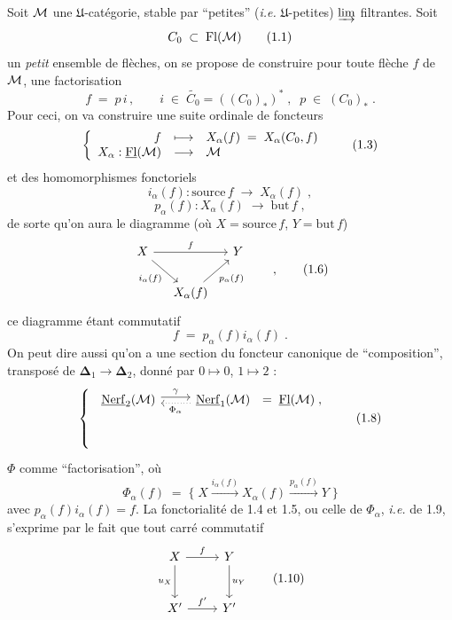 Soit $\mathcal{M}$ une $\mathfrak{U}$-catégorie, stable par “petites” (\textit{i.e.} $\mathfrak{U}$-petites) $\varinjlim$ filtrantes. Soit
\[
C_0 \;\subset\; \mathrm{Fl}(\mathcal{M})
\tag*{(1.1)}
\]
un \textit{petit} ensemble de flèches, on se propose de construire pour toute flèche $f$ de $\mathcal{M}$, une factorisation
\[
f \;=\; p\,i \,, \qquad i \;\in\; \widetilde{C_0} = ((C_0)_*)^* \;, \;\; p \;\in\; (C_0)_* \;.
\tag*{(1.2)}
\]
Pour ceci, on va construire une suite ordinale de foncteurs
\[
\left\{
\begin{array}{rcl}
f & \longmapsto & X_\alpha(f) \;=\; X_\alpha(C_0,f) \\
X_\alpha : \underline{\mathrm{Fl}}(\mathcal{M}) & \longrightarrow & \mathcal{M}
\end{array}
\right.
\tag*{(1.3)}
\]
et des homomorphismes fonctoriels
\[
i_\alpha(f) : \mathrm{source}\, f \;\longrightarrow\; X_\alpha(f) \;,
\tag*{(1.4)}
\]
\[
p_\alpha(f) : X_\alpha(f) \;\longrightarrow\; \mathrm{but}\, f \;,
\tag*{(1.5)}
\]
de sorte qu'on aura le diagramme (où $X = \mathrm{source}\, f$, $Y = \mathrm{but}\, f$)
\[
\begin{tikzcd}[column sep=small]
X \arrow[rr, "f"] \arrow[dr, "i_\alpha(f)"'] & & Y \\
& X_\alpha(f) \arrow[ur, "p_\alpha(f)"'] &
\end{tikzcd}
\qquad ,
\tag*{(1.6)}
\]
ce diagramme étant commutatif
\[
f \;=\; p_\alpha(f) i_\alpha(f) \;.
\tag*{(1.7)}
\]
On peut dire aussi qu'on a une section du foncteur canonique de “composition”, transposé de $\boldsymbol{\Delta}_1 \longrightarrow \boldsymbol{\Delta}_2$, donné par $0 \longmapsto 0$, $1 \longmapsto 2$ :
\[
\left\{
\begin{array}{l}
\begin{tikzcd}[ampersand replacement=\&]
\uNerf_2(\M) \arrow[r, shift left, "\gamma"] \& \uNerf_1(\M) \arrow[l, dotted, shift left, "\Phi_\alpha"]
\end{tikzcd}
\;=\; \uFl(\M) \;, \\[1ex]
\\[1ex]
\\
\end{array}
\right.
\tag*{(1.8)}
\]
$\Phi$ comme “factorisation”,
où
\[
\Phi_\alpha(f) \;=\; \{\; X \xrightarrow{i_\alpha(f)} X_\alpha(f) \xrightarrow{p_\alpha(f)} Y \;\}
\tag*{(1.9)}
\]
avec $p_\alpha(f)i_\alpha(f) = f$. La fonctorialité de 1.4 et 1.5, ou celle de $\Phi_\alpha$, \textit{i.e.} de 1.9, s'exprime par le fait que tout carré commutatif
\[
\begin{tikzcd}[row sep=large]
X \arrow[r, "f"] \arrow[d, "u_X"'] & Y \arrow[d, "u_Y"] \\
X' \arrow[r, "{f'}"] & Y'
\end{tikzcd}
\tag*{(1.10)}
\]
